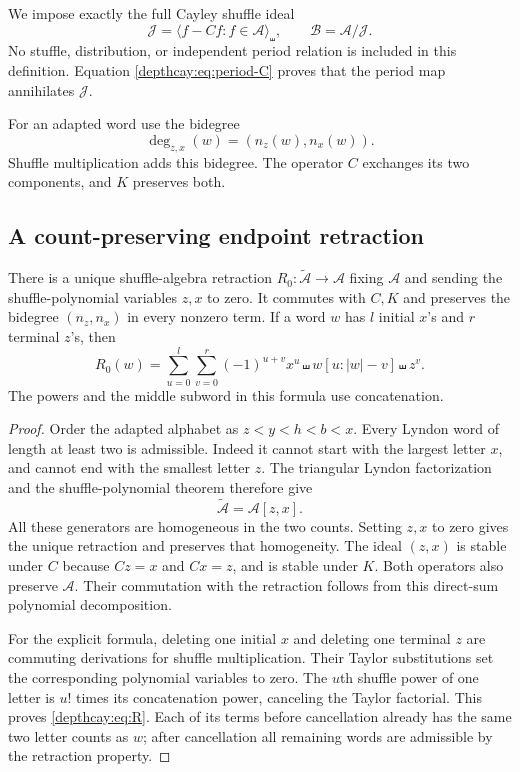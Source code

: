 We impose exactly the full Cayley shuffle ideal
\begin{equation}\label{depthcay:eq:ideal}
 \mathcal J=\langle f-Cf:f\in\mathcal A\rangle_{\shuffle},
 \qquad \mathcal B=\mathcal A/\mathcal J.
\end{equation}
No stuffle, distribution, or independent period relation is included in
this definition. Equation \eqref{depthcay:eq:period-C} proves that the
period map annihilates $\mathcal J$.

For an adapted word use the bidegree
\[
 \deg_{z,x}(w)=(n_z(w),n_x(w)).
\]
Shuffle multiplication adds this bidegree. The operator $C$ exchanges
its two components, and $K$ preserves both.

\subsection{A count-preserving endpoint retraction}

\begin{lemma}\label{depthcay:lem:R}
There is a unique shuffle-algebra retraction
$R_0:\widetilde{\mathcal A}\to\mathcal A$ fixing $\mathcal A$ and
sending the shuffle-polynomial variables $z,x$ to zero. It commutes
with $C,K$ and preserves the bidegree $(n_z,n_x)$ in every nonzero term.
If a word $w$ has $l$ initial $x$'s and $r$ terminal $z$'s, then
\begin{equation}\label{depthcay:eq:R}
 R_0(w)=\sum_{u=0}^{l}\sum_{v=0}^{r}(-1)^{u+v}
 x^u\shuffle w[u:|w|-v]\shuffle z^v.
\end{equation}
The powers and the middle subword in this formula use concatenation.
\end{lemma}

\begin{proof}
Order the adapted alphabet as $z<y<h<b<x$. Every Lyndon word of
length at least two is admissible. Indeed it cannot start with the
largest letter $x$, and cannot end with the smallest letter $z$.
The triangular Lyndon factorization and the shuffle-polynomial theorem
therefore give
\[
 \widetilde{\mathcal A}=\mathcal A[z,x].
\]
All these generators are homogeneous in the two counts. Setting $z,x$
to zero gives the unique retraction and preserves that homogeneity.
The ideal $(z,x)$ is stable under $C$ because $Cz=x$ and $Cx=z$,
and is stable under $K$. Both operators also preserve $\mathcal A$.
Their commutation with the retraction follows from this direct-sum
polynomial decomposition.

For the explicit formula, deleting one initial $x$ and deleting one
terminal $z$ are commuting derivations for shuffle multiplication.
Their Taylor substitutions set the corresponding polynomial variables
to zero. The $u$th shuffle power of one letter is $u!$ times its
concatenation power, canceling the Taylor factorial. This proves
\eqref{depthcay:eq:R}. Each of its terms before cancellation already
has the same two letter counts as $w$; after cancellation all remaining
words are admissible by the retraction property.
\end{proof}

